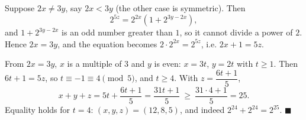 Suppose $2x\ne3y$, say $2x<3y$ (the other case is symmetric). Then
\[
2^{5z}=2^{2x}\left(1+2^{3y-2x}\right),
\]
and $1+2^{3y-2x}$ is an odd number greater than $1$, so it cannot divide a power of $2$. Hence $2x=3y$, and the equation becomes $2\cdot2^{2x}=2^{5z}$, i.e. $2x+1=5z$.

From $2x=3y$, $x$ is a multiple of $3$ and $y$ is even: $x=3t$, $y=2t$ with $t\ge1$. Then $6t+1=5z$, so $t\equiv-1\equiv4\pmod5$, and $t\ge4$. With $z=\dfrac{6t+1}{5}$,
\[
x+y+z=5t+\dfrac{6t+1}{5}=\dfrac{31t+1}{5}\ \ge\ \dfrac{31\cdot4+1}{5}=25 .
\]
Equality holds for $t=4$: $(x,y,z)=(12,8,5)$, and indeed $2^{24}+2^{24}=2^{25}$. $\blacksquare$
